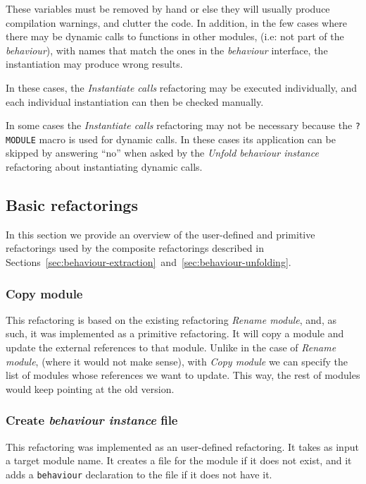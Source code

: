 These variables must be removed by hand or else they will usually
produce compilation warnings, and clutter the code. In addition, in
the few cases where there may be dynamic calls to functions in other
modules, (i.e: not part of the \emph{behaviour}), with names that
match the ones in the \emph{behaviour} interface, the instantiation
may produce wrong results.

In these cases, the \emph{Instantiate calls} refactoring may be executed
individually, and each individual instantiation can then be checked
manually.

In some cases the \emph{Instantiate calls} refactoring may not be
necessary because the \texttt{?MODULE} macro is used for dynamic calls.
In these cases its application can be skipped by answering ``no''
when asked by the \emph{Unfold behaviour instance} refactoring about
instantiating dynamic calls.


\subsection{Basic refactorings}

In this section we provide an overview of the user-defined and primitive
refactorings used by the composite refactorings described in 
Sections~\ref{sec:behaviour-extraction}~and~\ref{sec:behaviour-unfolding}.


\subsubsection{Copy module\label{sub:copy_mod}}

This refactoring is based on the existing refactoring \emph{Rename
module}, and, as such, it was implemented as a primitive refactoring.
It will copy a module and update the external references to that module.
Unlike in the case of \emph{Rename module}, (where it would not make
sense), with \emph{Copy module} we can specify the list of modules
whose references we want to update. This way, the rest of modules
would keep pointing at the old version.


\subsubsection{Create \emph{behaviour instance} file\label{sub:create_behav_instance}}

This refactoring was implemented as an user-defined refactoring. It
takes as input a target module name. It creates a file for the module
if it does not exist, and it adds a \texttt{behaviour} declaration
to the file if it does not have it.


